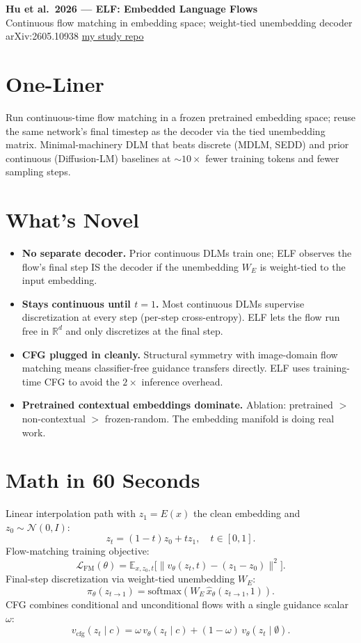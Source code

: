 \documentclass[10pt]{article}
\begin{document}
\begin{center}
  {\Large\textbf{Hu et al.\ 2026 --- ELF: Embedded Language Flows}}\\[2pt]
  {\small Continuous flow matching in embedding space; weight-tied unembedding decoder \quad\textbar\quad arXiv:2605.10938 \quad\textbar\quad \href{https://github.com/pleyva2004/elf-embedded-language-flows}{my study repo}}
\end{center}

\section*{One-Liner}
Run continuous-time flow matching in a frozen pretrained embedding space; reuse the same network's final timestep as the decoder via the tied unembedding matrix. Minimal-machinery DLM that beats discrete (MDLM, SEDD) and prior continuous (Diffusion-LM) baselines at $\sim 10\times$ fewer training tokens and fewer sampling steps.

\section*{What's Novel}
\begin{itemize}
  \item \textbf{No separate decoder.} Prior continuous DLMs train one; ELF observes the flow's final step IS the decoder if the unembedding $W_E$ is weight-tied to the input embedding.
  \item \textbf{Stays continuous until $t = 1$.} Most continuous DLMs supervise discretization at every step (per-step cross-entropy). ELF lets the flow run free in $\mathbb{R}^d$ and only discretizes at the final step.
  \item \textbf{CFG plugged in cleanly.} Structural symmetry with image-domain flow matching means classifier-free guidance transfers directly. ELF uses training-time CFG to avoid the $2\times$ inference overhead.
  \item \textbf{Pretrained contextual embeddings dominate.} Ablation: pretrained $>$ non-contextual $>$ frozen-random. The embedding manifold is doing real work.
\end{itemize}

\section*{Math in 60 Seconds}
Linear interpolation path with $z_1 = E(x)$ the clean embedding and $z_0 \sim \mathcal{N}(0, I)$:
\[
  z_t = (1 - t) z_0 + t z_1, \quad t \in [0,1].
\]
Flow-matching training objective:
\[
  \mathcal{L}_\text{FM}(\theta) = \mathbb{E}_{x, z_0, t}\big[\|v_\theta(z_t, t) - (z_1 - z_0)\|^2\big].
\]
Final-step discretization via weight-tied unembedding $W_E$:
\[
  \pi_\theta(z_{t \to 1}) = \mathrm{softmax}(W_E \, \hat{x}_\theta(z_{t \to 1}, 1)).
\]
CFG combines conditional and unconditional flows with a single guidance scalar $\omega$:
\[
  v_\text{cfg}(z_t \mid c) = \omega \, v_\theta(z_t \mid c) + (1 - \omega) \, v_\theta(z_t \mid \emptyset).
\]
\end{document}
